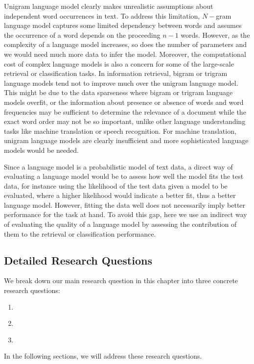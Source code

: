 Unigram language model clearly makes unrealistic assumptions about independent word occurrences in text. To address this limitation, $N-$gram language model captures some limited dependency between words and assumes the occurrence of a word depends on the proceeding $n-1$ words.  However, as the complexity of a language model increases, so does the number of parameters and we would need much more data to infer the model. Moreover, the computational cost of complex language models is also a concern for some of the large-scale retrieval or classification tasks. 
%
In information retrieval, bigram or trigram language models tend not to improve much over the unigram language model. This might be due to the data sparseness where bigram or trigram language models overfit, or the information about presence or absence of words and word frequencies may be sufficient to determine the relevance of a document while the exact word order may not be so important, unlike other language understanding tasks like machine translation or speech recognition. For machine translation, unigram language models are clearly insufficient and more sophisticated language models would be needed. 

Since a language model is a probabilistic model of text data, a direct way of evaluating a language model would be to assess how well the model fits the test data, for instance using the likelihood of the test data given a model to be evaluated, where a higher likelihood would indicate a better fit, thus a better language model.
However, fitting the data well does not necessarily imply better performance for the task at hand. To avoid this gap, here we use an indirect way of evaluating the quality of a language model by assessing the contribution of them to the retrieval or classification performance.

\subsection{Detailed Research Questions}
We break down our main research question in this chapter into three concrete research questions:
\begin{resqbox}
\begin{enumerate}
\item[\textbf{\resqname{c2.1}}] \emph{}
\item[\textbf{\resqname{c2.2}}] \emph{}
\item[\textbf{\resqname{c2.3}}] \emph{}
\end{enumerate}
\end{resqbox}
In the following sections, we will address these research questions.

